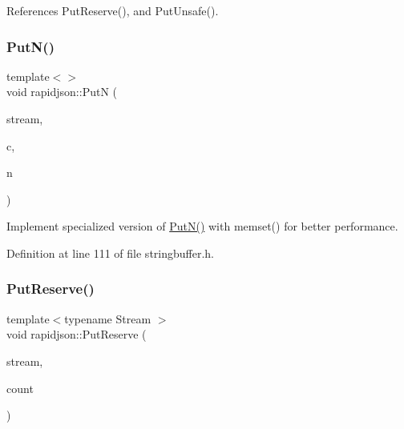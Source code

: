 References Put\+Reserve(), and Put\+Unsafe().

\mbox{\label{namespacerapidjson_a9d43be9c033dc49738b713fe6fbafecf}} 
\subsubsection{\texorpdfstring{PutN()}{PutN()}\hspace{0.1cm}{\footnotesize\ttfamily [4/4]}}
{\footnotesize\ttfamily template$<$$>$ \\
void rapidjson\+::\+PutN (\begin{DoxyParamCaption}\item[{\mbox{\hyperlink{classrapidjson_1_1_generic_string_buffer}{Generic\+String\+Buffer}}$<$ \mbox{\hyperlink{structrapidjson_1_1_u_t_f8}{U\+T\+F8}}$<$$>$ $>$ \&}]{stream,  }\item[{char}]{c,  }\item[{size\+\_\+t}]{n }\end{DoxyParamCaption})}



Implement specialized version of \mbox{\hyperlink{namespacerapidjson_a1ac13bac5976fc06587e00fc0bcfb32a}{Put\+N()}} with memset() for better performance. 



Definition at line 111 of file stringbuffer.\+h.


\begin{DoxyCode}{0}

\end{DoxyCode}
\mbox{\label{namespacerapidjson_a820f77efccfbb749bd15fe4822d2c740}} 
\subsubsection{\texorpdfstring{PutReserve()}{PutReserve()}\hspace{0.1cm}{\footnotesize\ttfamily [1/2]}}
{\footnotesize\ttfamily template$<$typename Stream $>$ \\
void rapidjson\+::\+Put\+Reserve (\begin{DoxyParamCaption}\item[{\mbox{\hyperlink{classrapidjson_1_1_stream}{Stream}} \&}]{stream,  }\item[{size\+\_\+t}]{count }\end{DoxyParamCaption})}



